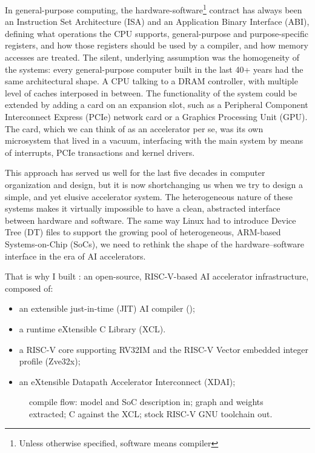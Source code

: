In general-purpose computing, the hardware-software\footnote{Unless otherwise specified, software means compiler} 
contract has always been an Instruction Set Architecture (ISA) and an Application Binary Interface (ABI), defining
what operations the CPU supports, general-purpose and purpose-specific registers, and how those registers should be
used by a compiler, and how memory accesses are treated.
The silent, underlying assumption was the homogeneity of the systems: every general-purpose computer built in the last 40+ years
had the same architectural shape. A CPU talking to a DRAM controller, with multiple level of caches interposed in between.
The functionality of the system could be extended by adding a card on an expansion slot, such as a Peripheral Component Interconnect Express ({PCIe}) network card or a Graphics Processing Unit ({GPU}).
The card, which we can think of as an accelerator per se, was its own microsystem that lived in a vacuum, interfacing with the main 
system by means of interrupts, PCIe transactions and kernel drivers.

This approach has served us well for the last five decades in computer organization and design, but it is now shortchanging us when we try to design a simple, and yet elusive accelerator system.
The heterogeneous nature of these systems makes it virtually impossible to have a clean, abstracted interface between hardware and software.
The same way Linux had to introduce Device Tree ({DT}) files to support the growing pool of heterogeneous, ARM-based Systems-on-Chip ({SoCs}), we need to rethink the shape
of the hardware--software interface in the era of AI accelerators.

That is why I built \tv{}: an open-source, {RISC-V}-based {AI}
accelerator infrastructure, composed of:
\begin{itemize}
  \item an extensible just-in-time ({JIT}) {AI} compiler (\pyv{});
  \item a runtime eXtensible {C} Library ({XCL}).
  \item a {RISC-V} core supporting {RV32IM} and the {RISC-V} Vector
        embedded integer profile ({Zve32x});
  \item an eXtensible Datapath Accelerator Interconnect ({XDAI});
\end{itemize}

\begin{figure}[t]
  \centering
  
  \caption{\pyv{} compile flow: model and {SoC} description in;
    graph and weights extracted; {C} against the {XCL}; stock
    {RISC-V} {GNU} toolchain out.}
  \label{fig:pyvedas-flow}
\end{figure}

